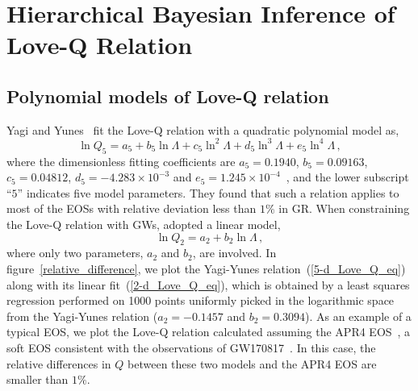 \documentclass[a4paper,11pt]{article}
\begin{document}
\section{Hierarchical Bayesian Inference of Love-Q Relation}
\label{sec:framework}

\subsection{Polynomial models of Love-Q relation} 
\label{subsec:framework_parameterization}

Yagi and Yunes~\cite{Yagi:2013bca, Yagi:2013awa, Yagi_2017} fit the Love-Q
relation with a quadratic polynomial model as,
\begin{equation}
\label{5-d_Love_Q_eq}
    \ln Q_{5}=a_5 + b_5 \ln \Lambda + c_5 \ln^2\Lambda + d_5 \ln^3\Lambda + e_5
    \ln^4 \Lambda\,,
\end{equation}
where the dimensionless fitting coefficients are $a_5=0.1940$, $b_5=0.09163$,
$c_5=0.04812$, $d_5=-4.283\times 10^{-3}$ and $e_5=1.245\times
10^{-4}$~\cite{Yagi_2017}, and the lower subscript ``$5$'' indicates five model
parameters.  They found that such a relation applies to most of the EOSs with 
relative deviation less than $1\%$ in GR. When constraining the Love-Q relation
with GWs, \citet{Samajdar:2020xrd} adopted a linear model,
\begin{equation}
\label{2-d_Love_Q_eq}
    \ln Q_{2} = a_2 + b_2 \ln \Lambda\,,
\end{equation}
where only two parameters, $a_2$ and $b_2$, are involved.  In
figure~\ref{relative_difference}, we plot the Yagi-Yunes
relation~(\ref{5-d_Love_Q_eq}) along with its linear fit~(\ref{2-d_Love_Q_eq}),
which is obtained by a least squares regression performed on 1000 points
uniformly picked in the logarithmic space from the Yagi-Yunes relation ($a_2=-0.1457$
and $b_2=0.3094$).  As an example of a typical EOS, we plot the
Love-Q relation calculated assuming the APR4 EOS~\cite{PhysRevC.58.1804}, a soft
EOS consistent with the observations of GW170817~\cite{LIGOScientific:2017vwq,
LIGOScientific:2018cki, LIGOScientific:2018hze}. In this case, the relative
differences in $Q$ between these two models and the APR4 EOS are smaller
than $1\%$. 
\end{document}
